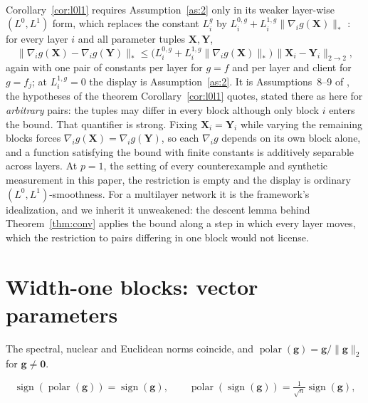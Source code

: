 \paragraph{} Corollary~\ref{cor:l0l1} requires Assumption~\ref{as:2} only in its weaker layer-wise $(L^0,L^1)$ form, which replaces the constant $L_i^{g}$ by $L^{0,g}_i + L^{1,g}_i\|\nabla_i g(\mathbf{X})\|_{*}$ \citep{riabinin2025gluon,pethick2025generalized}: for every layer $i$ and all parameter tuples $\mathbf{X},\mathbf{Y}$,
\begin{equation}
\|\nabla_i g(\mathbf{X}) - \nabla_i g(\mathbf{Y})\|_{*} \le \bigl(L^{0,g}_i + L^{1,g}_i\|\nabla_i g(\mathbf{X})\|_{*}\bigr)\,\|\mathbf{X}_i - \mathbf{Y}_i\|_{2\to 2},
\end{equation}
again with one pair of constants per layer for $g=f$ and per layer and client for $g=f_j$; at $L^{1,g}_i=0$ the display is Assumption~\ref{as:2}. It is Assumptions~8--9 of \citet{gruntkowska2025error}, the hypotheses of the theorem Corollary~\ref{cor:l0l1} quotes, stated there as here for \emph{arbitrary} pairs: the tuples may differ in every block although only block $i$ enters the bound. That quantifier is strong. Fixing $\mathbf{X}_i=\mathbf{Y}_i$ while varying the remaining blocks forces $\nabla_i g(\mathbf{X})=\nabla_i g(\mathbf{Y})$, so each $\nabla_i g$ depends on its own block alone, and a function satisfying the bound with finite constants is additively separable across layers. At $p=1$, the setting of every counterexample and synthetic measurement in this paper, the restriction is empty and the display is ordinary $(L^0,L^1)$-smoothness. For a multilayer network it is the framework's idealization, and we inherit it unweakened: the descent lemma behind Theorem~\ref{thm:conv} applies the bound along a step in which every layer moves, which the restriction to pairs differing in one block would not license.

\section{Width-one blocks: vector parameters}\label{app:vector}

 The spectral, nuclear and Euclidean norms coincide, and $\operatorname{polar}(\mathbf{g})=\mathbf{g}/\|\mathbf{g}\|_2$ for $\mathbf{g}\neq\mathbf{0}$. 

\begin{equation*}
\operatorname{sign}(\operatorname{polar}(\mathbf{g}))=\operatorname{sign}(\mathbf{g}),\qquad
\operatorname{polar}(\operatorname{sign}(\mathbf{g}))=\tfrac{1}{\sqrt{n}}\operatorname{sign}(\mathbf{g}),
\end{equation*}

